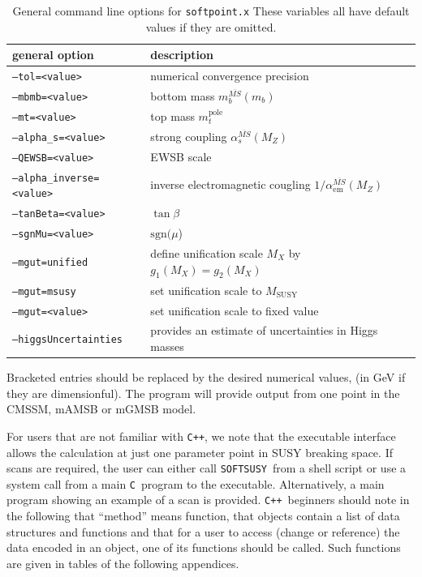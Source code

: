 \documentclass{article}
\def\SOFTSUSY{{\tt SOFTSUSY}}
\def\code#1{\small{\tt #1}\normalsize}
\begin{document}
\begin{table}[tbh]
  \centering
  \begin{tabular}{ll}
    general option & description \\
    \hline
    \code{--tol=<value>} & numerical convergence precision \\
    \code{--mbmb=<value>} & bottom mass $m_b^{\overline{MS}}(m_b)$ \\
    \code{--mt=<value>} & top mass $m_t^\text{pole}$ \\
    \code{--alpha\_s=<value>} & strong coupling $\alpha_s^{\overline{MS}}(M_Z)$ \\
    \code{--QEWSB=<value>} & EWSB scale \\
    \code{--alpha\_inverse=<value>} & inverse electromagnetic cougling
    $1/\alpha^{\overline{MS}}_\text{em}(M_Z)$ \\
    \code{--tanBeta=<value>} & $\tan\beta$ \\
    \code{--sgnMu=<value>} & $\text{sgn}(\mu$) \\
    \code{--mgut=unified} & define unification scale $M_X$ by $g_1(M_X)=g_2(M_X)$ \\
    \code{--mgut=msusy} & set unification scale to $M_\text{SUSY}$ \\
    \code{--mgut=<value>} & set unification scale to fixed value \\
    \code{--higgsUncertainties} & provides an estimate of uncertainties in
      Higgs masses\\
    \hline
  \end{tabular}
  \caption{General command line options for \code{softpoint.x} These variables
    all have  default values if they are omitted.}
  \label{tab:general-cmd-line-options}
\end{table}
%
Bracketed entries should be replaced by the desired numerical values, (in GeV
if they are dimensionful). The program will provide output from one point in
the CMSSM, mAMSB or mGMSB model. 

For users that are not familiar with \code{C++}, we note that the executable
interface allows the calculation at just one parameter point in SUSY breaking 
space. If scans are required, the user can either call \SOFTSUSY~from a
shell script or use a system call from a main \code{C}~program to the
executable. Alternatively, a main program showing an example of a scan is
provided. \code{C++}~beginners should note in
the following that ``method'' means function, that objects contain a list of
data structures and functions and that for a user to access (change
or reference) the data encoded in an object, one of its functions should be
called. Such functions are given in tables of the following appendices.
\end{document}
